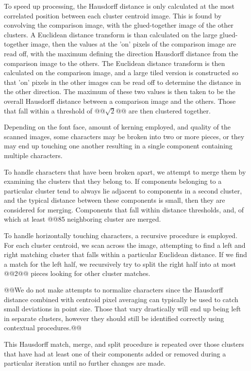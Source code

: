 \documentclass[times, 10pt,twocolumn]{article}
\begin{document}
To speed up processing, the Hausdorff distance is only calculated at the most 
correlated position between each cluster centroid image.  This is found by 
convolving the comparison image, with the glued-together image of the other 
clusters.  A Euclidean distance transform is than calculated on the large
glued-together image, then the values at the 'on' pixels of the comparison
image are read off, with the maximum defining the direction Hausdorff distance
from the comparison image to the others.  The Euclidean distance transform is
then calculated on the comparison image, and a large tiled version is
constructed so that 'on' pixels in the other images can be read off to
determine the distance in the other direction.  The maximum of these two
values is then taken to be the overall Hausdorff distance between a comparison
image and the others.  Those that fall within a threshold of @@$\sqrt 2$@@
are then clustered together.

Depending on the font face, amount of kerning employed, and quality of the 
scanned images, some characters may be broken into two or more pieces, or they
may end up touching one another resulting in a single component containing
multiple characters.

To handle characters that have been broken apart, we attempt to merge them by
examining the clusters that they belong to.  If components belonging to a
particular cluster tend to always lie adjacent to components in a second
cluster, and the typical distance between these components is small, then they
are considered for merging.  Components that fall within distance thresholds,
and, of which at least @@85%
neighboring cluster are merged.

To handle horizontally touching characters, a recursive procedure is employed.  
For each cluster centroid, we scan across the image, attempting to find a left
and right matching cluster that falls within a particular Euclidean distance.
If we find a match for the left half, we recursively try to split the right
half into at most @@2@@ pieces looking for other cluster matches.

@@We do not make attempts to normalize characters since the Hausdorff distance
combined with centroid pixel averaging can typically be used to catch small
deviations in point size.  Those that vary drastically will end up being left
in separate clusters, however they should still be identified correctly using
contextual procedures.@@

This Hausdorff match, merge, and split procedure is repeated over those 
clusters that have had at least one of their components added or removed during
a particular iteration until no further changes are made.
\end{document}
